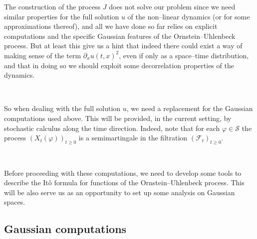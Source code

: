 \documentclass[a4paper,11pt]{article}
\newcommand{\CS}{\mathscr{S}}
\begin{document}
The construction of the process $J$ does not solve our problem since we need
similar properties for the full solution $u$ of the non--linear dynamics (or
for some approximations thereof), and all we have done so far relies on
explicit computations and the specific Gaussian features of the
Ornstein--Uhlenbeck process. But at least this give us a hint that indeed
there could exist a way of making sense of the term $\partial_x u (t, x)^2$,
even if only as a space--time distribution, and that in doing so we should
exploit some decorrelation properties of the dynamics.

\

So when dealing with the full solution $u$, we need a replacement for the
Gaussian computations used above. This will be provided, in the current
setting, by stochastic calculus along the time direction. Indeed, note that
for each $\varphi \in \CS$ the process $(X_t (\varphi))_{t \geqslant 0}$ is a
semimartingale in the filtration $(\mathcal{F}_t)_{t \geqslant 0}$.

\

Before proceeding with these computations, we need to develop some tools to
describe the It{\^o} formula for functions of the Ornstein--Uhlenbeck process.
This will be also serve us as an opportunity to set up some analysis on
Gaussian spaces.

\subsection{Gaussian computations}
\end{document}
